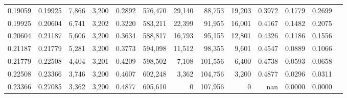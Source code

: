 \begin{tabular}{rrrrrrrrrrrrr}
0.19059 & 0.19925 &  7,866 & 3,200 &                                     0.2892 & 576,470 &  29,140 &  88,753 &  19,203 & 0.3972 & 0.1779 & 0.2699 \\
0.19925 & 0.20604 &  6,741 & 3,202 &                                     0.3220 & 583,211 &  22,399 &  91,955 &  16,001 & 0.4167 & 0.1482 & 0.2075 \\
0.20604 & 0.21187 &  5,606 & 3,200 &                                     0.3634 & 588,817 &  16,793 &  95,155 &  12,801 & 0.4326 & 0.1186 & 0.1556 \\
0.21187 & 0.21779 &  5,281 & 3,200 &                                     0.3773 & 594,098 &  11,512 &  98,355 &   9,601 & 0.4547 & 0.0889 & 0.1066 \\
0.21779 & 0.22508 &  4,404 & 3,201 &                                     0.4209 & 598,502 &   7,108 & 101,556 &   6,400 & 0.4738 & 0.0593 & 0.0658 \\
0.22508 & 0.23366 &  3,746 & 3,200 &                                     0.4607 & 602,248 &   3,362 & 104,756 &   3,200 & 0.4877 & 0.0296 & 0.0311 \\
0.23366 & 0.27085 &  3,362 & 3,200 &                                     0.4877 & 605,610 &       0 & 107,956 &       0 &    nan & 0.0000 & 0.0000 \\
\bottomrule
\end{tabular}
